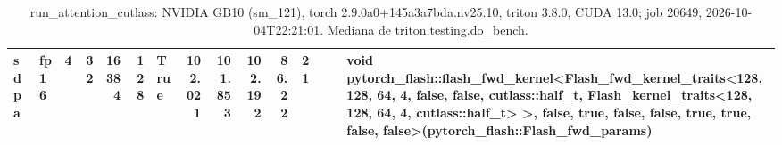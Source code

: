 \begin{table}[htbp]
\begin{tabular}{llrrrrlrrrrrlll}
    sdpa & fp16 & 4 & 32 & 16384 & 128 & True & 102.021 & 101.853 & 102.192 & 86.22 & 21 &  &  & void pytorch\_flash::flash\_fwd\_kernel<Flash\_fwd\_kernel\_traits<128, 128, 64, 4, false, false, cutlass::half\_t, Flash\_kernel\_traits<128, 128, 64, 4, cutlass::half\_t> >, false, true, false, false, true, true, false, false>(pytorch\_flash::Flash\_fwd\_params) \\
    \bottomrule
  \end{tabular}
  \caption{run\_attention\_cutlass: NVIDIA GB10 (sm\_121), torch 2.9.0a0+145a3a7bda.nv25.10, triton 3.8.0, CUDA 13.0; job 20649, 2026-10-04T22:21:01. Mediana de triton.testing.do\_bench.}
  \label{tab:hennessy-run-attention-cutlass}
\end{table}

